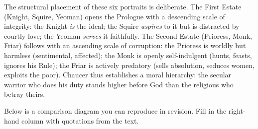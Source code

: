 \documentclass[11pt]{article}
\newcommand{\cle}[1]{{\popxbold\color{popdark}#1}}
\begin{document}
The structural placement of these six portraits is deliberate. The \cle{First Estate} (Knight, Squire, Yeoman) opens the Prologue with a \cle{descending scale of integrity}: the Knight \emph{is} the ideal; the Squire \emph{aspires} to it but is distracted by courtly love; the Yeoman \emph{serves} it faithfully. The \cle{Second Estate} (Prioress, Monk, Friar) follows with an \cle{ascending scale of corruption}: the Prioress is \cle{worldly but harmless} (sentimental, affected); the Monk is \cle{openly self-indulgent} (hunts, feasts, ignores his Rule); the Friar is \cle{actively predatory} (sells absolution, seduces women, exploits the poor). Chaucer thus establishes a \cle{moral hierarchy}: the secular warrior who does his duty stands higher before God than the religious who betray theirs.

\begin{experience}
Below is a comparison diagram you can reproduce in revision. Fill in the right-hand column with quotations from the text.

\begin{popfigure}
\centering
{}
\end{popfigure}
\end{experience}
\end{document}
